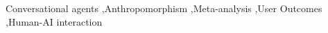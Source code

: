 \documentclass[preprint,review,12pt,authoryear,nonatbib]{elsarticle}
\begin{document}
\begin{frontmatter}


\begin{keyword}
Conversational agents \sep Anthropomorphism \sep Meta-analysis \sep User Outcomes \sep Human-AI interaction
\end{keyword}

\end{frontmatter}
\end{document}
